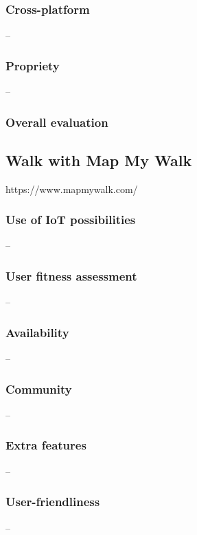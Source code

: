 \subsubsection*{Cross-platform} -- 
\subsubsection*{Propriety} -- 
\subsubsection*{Overall evaluation}
\subsection{Walk with Map My Walk}
https://www.mapmywalk.com/
\subsubsection*{Use of IoT possibilities} --
\subsubsection*{User fitness assessment} --
\subsubsection*{Availability} --
\subsubsection*{Community} -- 
\subsubsection*{Extra features} -- 
\subsubsection*{User-friendliness} -- 

